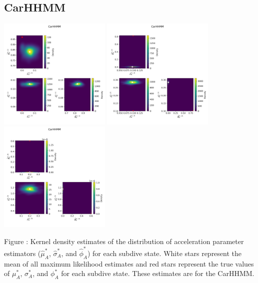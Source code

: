 \documentclass{article}
\begin{document}
        \subsection{CarHHMM}
        \begin{center}
        \includegraphics[width=2.1in]{../Plots/hhmm_V_MLE_density_A_0_0.png}
        \includegraphics[width=2.1in]{../Plots/hhmm_V_MLE_density_A_0_1.png}
        \includegraphics[width=2.1in]{../Plots/hhmm_V_MLE_density_A_0_2.png}
        \end{center}
        
        \noindent Figure : Kernel density estimates of the distribution of acceleration parameter estimators ($\hat \mu^*_A$, $\hat \sigma^*_A$, and $\hat \phi^*_A$) for each subdive state. White stars represent the mean of all maximum likelihood estimates and red stars represent the true values of $\mu^*_A$, $\sigma^*_A$, and $\phi^*_A$ for each subdive state. These estimates are for the CarHHMM. 
        \addtocounter{fignum}{1}
        
\end{document}
